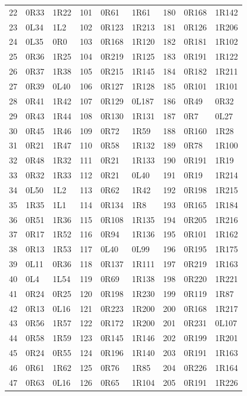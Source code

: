 \begin{longtable}{rll@{\hspace{1.3em}}rll@{\hspace{1.3em}}rll}
22 & 0R33 & 1R22 & 101 & 0R61 & 1R61 & 180 & 0R168 & 1R142\\
23 & 0L34 & 1L2 & 102 & 0R123 & 1R213 & 181 & 0R126 & 1R206\\
24 & 0L35 & 0R0 & 103 & 0R168 & 1R120 & 182 & 0R181 & 1R102\\
25 & 0R36 & 1R25 & 104 & 0R219 & 1R125 & 183 & 0R191 & 1R122\\
26 & 0R37 & 1R38 & 105 & 0R215 & 1R145 & 184 & 0R182 & 1R211\\
27 & 0R39 & 0L40 & 106 & 0R127 & 1R128 & 185 & 0R101 & 1R101\\
28 & 0R41 & 1R42 & 107 & 0R129 & 0L187 & 186 & 0R49 & 0R32\\
29 & 0R43 & 1R44 & 108 & 0R130 & 1R131 & 187 & 0R7 & 0L27\\
30 & 0R45 & 1R46 & 109 & 0R72 & 1R59 & 188 & 0R160 & 1R28\\
31 & 0R21 & 1R47 & 110 & 0R58 & 1R132 & 189 & 0R78 & 1R100\\
32 & 0R48 & 1R32 & 111 & 0R21 & 1R133 & 190 & 0R191 & 1R19\\
33 & 0R32 & 1R33 & 112 & 0R21 & 0L40 & 191 & 0R19 & 1R214\\
34 & 0L50 & 1L2 & 113 & 0R62 & 1R42 & 192 & 0R198 & 1R215\\
35 & 1R35 & 1L1 & 114 & 0R134 & 1R8 & 193 & 0R165 & 1R184\\
36 & 0R51 & 1R36 & 115 & 0R108 & 1R135 & 194 & 0R205 & 1R216\\
37 & 0R17 & 1R52 & 116 & 0R94 & 1R136 & 195 & 0R101 & 1R162\\
38 & 0R13 & 1R53 & 117 & 0L40 & 0L99 & 196 & 0R195 & 1R175\\
39 & 0L11 & 0R36 & 118 & 0R137 & 1R111 & 197 & 0R219 & 1R163\\
40 & 0L4 & 1L54 & 119 & 0R69 & 1R138 & 198 & 0R220 & 1R221\\
41 & 0R24 & 0R25 & 120 & 0R198 & 1R230 & 199 & 0R119 & 1R87\\
42 & 0R13 & 0L16 & 121 & 0R223 & 1R200 & 200 & 0R168 & 1R217\\
43 & 0R56 & 1R57 & 122 & 0R172 & 1R200 & 201 & 0R231 & 0L107\\
44 & 0R58 & 1R59 & 123 & 0R145 & 1R146 & 202 & 0R199 & 1R201\\
45 & 0R24 & 0R55 & 124 & 0R196 & 1R140 & 203 & 0R191 & 1R163\\
46 & 0R61 & 1R62 & 125 & 0R76 & 1R85 & 204 & 0R226 & 1R164\\
47 & 0R63 & 0L16 & 126 & 0R65 & 1R104 & 205 & 0R191 & 1R226\\

\end{longtable}
